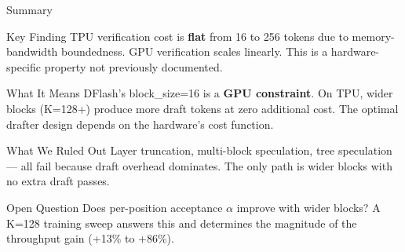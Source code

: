 \documentclass[10pt]{beamer}
\begin{document}
\begin{frame}{Summary}

\begin{block}{Key Finding}
TPU verification cost is \textbf{flat} from 16 to 256 tokens due to memory-bandwidth boundedness. GPU verification scales linearly. This is a hardware-specific property not previously documented.
\end{block}

\begin{block}{What It Means}
DFlash's block\_size=16 is a \textbf{GPU constraint}. On TPU, wider blocks (K=128+) produce more draft tokens at zero additional cost. The optimal drafter design depends on the hardware's cost function.
\end{block}

\begin{block}{What We Ruled Out}
Layer truncation, multi-block speculation, tree speculation --- all fail because draft overhead dominates. The only path is wider blocks with no extra draft passes.
\end{block}

\begin{alertblock}{Open Question}
Does per-position acceptance $\alpha$ improve with wider blocks? A K=128 training sweep answers this and determines the magnitude of the throughput gain (+13\% to +86\%).
\end{alertblock}
\end{frame}
\end{document}
